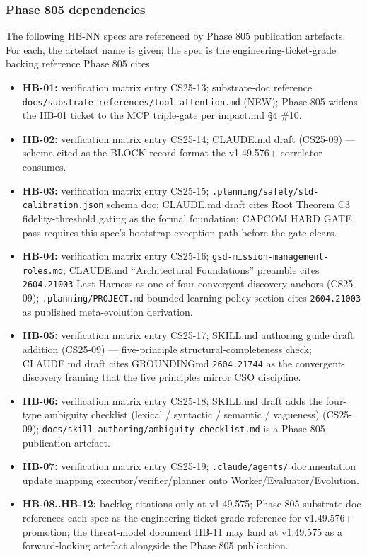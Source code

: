 \documentclass[11pt,letterpaper]{article}
\newcommand{\arxivid}[1]{\texttt{\textcolor{accent}{#1}}}
\providecommand{\tightlist}{\setlength{\itemsep}{0pt}\setlength{\parskip}{0pt}}
\begin{document}
\subsubsection{Phase 805 dependencies}

The following HB-NN specs are referenced by Phase 805 publication
artefacts. For each, the artefact name is given; the spec is the
engineering-ticket-grade backing reference Phase 805 cites.

\begin{itemize}
\tightlist
\item
  \textbf{HB-01:} verification matrix entry CS25-13; substrate-doc
  reference \texttt{docs/substrate-references/tool-attention.md} (NEW);
  Phase 805 widens the HB-01 ticket to the MCP triple-gate per impact.md
  §4 \#10.
\item
  \textbf{HB-02:} verification matrix entry CS25-14; CLAUDE.md draft
  (CS25-09) --- schema cited as the BLOCK record format the v1.49.576+
  correlator consumes.
\item
  \textbf{HB-03:} verification matrix entry CS25-15;
  \texttt{.planning/safety/std-calibration.json} schema doc; CLAUDE.md
  draft cites Root Theorem C3 fidelity-threshold gating as the formal
  foundation; CAPCOM HARD GATE pass requires this spec's
  bootstrap-exception path before the gate clears.
\item
  \textbf{HB-04:} verification matrix entry CS25-16;
  \texttt{gsd-mission-management-roles.md}; CLAUDE.md ``Architectural
  Foundations'' preamble cites \arxivid{2604.21003} Last Harness as one
  of four convergent-discovery anchors (CS25-09);
  \texttt{.planning/PROJECT.md} bounded-learning-policy section cites
  \arxivid{2604.21003} as published meta-evolution derivation.
\item
  \textbf{HB-05:} verification matrix entry CS25-17; SKILL.md authoring
  guide draft addition (CS25-09) --- five-principle
  structural-completeness check; CLAUDE.md draft cites GROUNDINGmd
  \arxivid{2604.21744} as the convergent-discovery framing that the five
  principles mirror CSO discipline.
\item
  \textbf{HB-06:} verification matrix entry CS25-18; SKILL.md draft adds
  the four-type ambiguity checklist (lexical / syntactic / semantic /
  vagueness) (CS25-09);
  \texttt{docs/skill-authoring/ambiguity-checklist.md} is a Phase 805
  publication artefact.
\item
  \textbf{HB-07:} verification matrix entry CS25-19;
  \texttt{.claude/agents/} documentation update mapping
  executor/verifier/planner onto Worker/Evaluator/Evolution.
\item
  \textbf{HB-08..HB-12:} backlog citations only at v1.49.575; Phase 805
  substrate-doc references each spec as the engineering-ticket-grade
  reference for v1.49.576+ promotion; the threat-model document HB-11
  may land at v1.49.575 as a forward-looking artefact alongside the
  Phase 805 publication.
\end{itemize}
\end{document}
